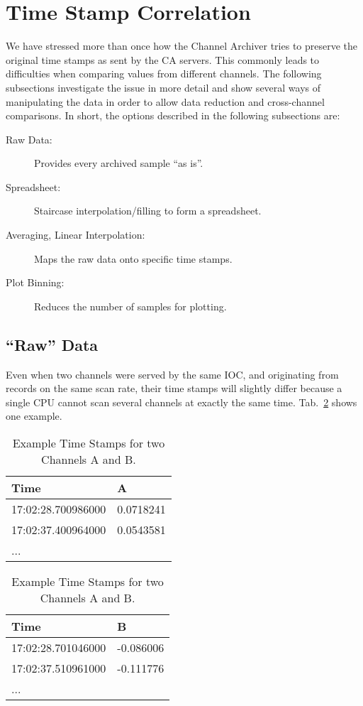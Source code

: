 \section{Time Stamp Correlation} \label{sec:timestampcorr}
We have stressed more than once how the Channel Archiver tries to preserve
the original time stamps as sent by the CA servers.  This commonly
leads to difficulties when comparing values from different
channels. The following subsections investigate the issue in more
detail and show several ways of manipulating the data in order to
allow data reduction and cross-channel comparisons.
In short, the options described in the following subsections are:
\begin{description}
\item[\sffamily Raw Data:]
  Provides every archived sample ``as is''.
\item[\sffamily Spreadsheet:]
  Staircase interpolation/filling to form a spreadsheet.
\item[\sffamily Averaging, Linear Interpolation:]
  Maps the raw data onto specific time stamps.
\item[\sffamily Plot Binning:]
  Reduces the number of samples for plotting.
\end{description}

\subsection{``Raw'' Data} \label{sec:rawdata}
Even when two channels were served by the same IOC, and originating from
records on the same scan rate, their time stamps will slightly differ
because a single CPU cannot scan several channels at exactly the same
time.  Tab.~\ref{tab:ABtimes} shows one example.

\begin{table}[htbp]
  \begin{center}
    \begin{minipage}[t]{0.49\textwidth}
      \sffamily
      \begin{tabular}[t]{l|l}
        Time               & A         \\
        \hline
        17:02:28.700986000 & 0.0718241 \\
        17:02:37.400964000 & 0.0543581 \\
        ...
      \end{tabular}
    \end{minipage}%
    \begin{minipage}[t]{0.49\textwidth}
      \sffamily
      \begin{tabular}[t]{l|l}
        Time               & B         \\
        \hline
        17:02:28.701046000 & -0.086006 \\
        17:02:37.510961000 & -0.111776 \\
        ...
      \end{tabular}
    \end{minipage}%
    \caption{Example Time Stamps for two Channels A and B.}
    \label{tab:ABtimes}
  \end{center}
\end{table}

